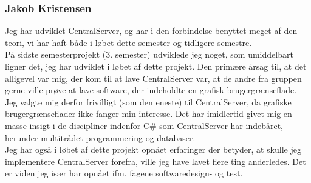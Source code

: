\subsubsection{Jakob Kristensen}
Jeg har udviklet CentralServer, og har i den forbindelse benyttet meget af den teori, vi har haft både i løbet dette semester og tidligere semestre.\\

På sidste semesterprojekt (3. semester) udviklede jeg noget, som umiddelbart ligner det, jeg har udviklet i løbet af dette projekt. Den primære årsag til, at det alligevel var mig, der kom til at lave CentralServer var, at de andre fra gruppen gerne ville prøve at lave software, der indeholdte en grafisk brugergrænseflade. Jeg valgte mig derfor frivilligt (som den eneste) til CentralServer, da grafiske brugergrænseflader ikke fanger min interesse. Det har imidlertid givet mig en masse insigt i de discipliner indenfor C\# som CentralServer har indebåret, herunder multitrådet programmering og databaser.\\

Jeg har også i løbet af dette projekt opnået erfaringer der betyder, at skulle jeg implementere CentralServer forefra, ville jeg have lavet flere ting anderledes. Det er viden jeg især har opnået ifm. fagene softwaredesign- og test.